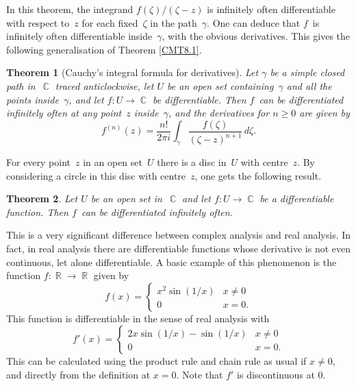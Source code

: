 \documentclass{amsproc}
\newtheorem{theorem}{Theorem}[subsection]
\theoremstyle{definition}
\theoremstyle{remark}
\DeclareMathOperator{\R}{\mathbb{R}}
\DeclareMathOperator{\C}{\mathbb{C}}
\numberwithin{equation}{section}
\begin{document}
In this theorem, the integrand $ f(\zeta)/(\zeta - z) $ is infinitely often differentiable with respect to~$ z $ for each fixed~$ \zeta $ in the path~$ \gamma $.
One can deduce that $ f $~is infinitely often differentiable inside~$ \gamma $, with the obvious derivatives. This gives the following generalisation of Theorem \ref{CMT8.1}.

\begin{theorem}[Cauchy's integral formula for derivatives] \label{CMT8.2}
Let $ \gamma $ be a simple closed path in~$ \C $ traced anticlockwise, let $ U $ be an open set containing~$ \gamma $ and all the points inside~$ \gamma $, and
let $ f: U \to \C $ be differentiable. Then $ f $~can be differentiated infinitely often at any point~$ z $ inside~$ \gamma $, and the derivatives for $ n \geq 0 $ are given by
$$
f^{(n)}(z) = \dfrac{n!}{2\pi i}\int_\gamma \dfrac{f(\zeta)}{(\zeta - z)^{n + 1}}\,d\zeta.
$$
\end{theorem}

For every point~$ z $ in an open set~$ U $ there is a disc in~$ U $ with centre~$ z $. By considering a circle in this disc with centre~$ z $, one gets the following result.

\begin{theorem} \label{CMT8.3}
Let $ U $ be an open set in~$ \C $ and let $ f: U \to \C $ be a differentiable function. Then $ f $~can be differentiated infinitely often.
\end{theorem}

This is a very significant difference between complex analysis and real analysis. In fact, in real analysis there are differentiable functions whose derivative
is not even continuous, let alone differentiable. A basic example of this phenomenon is the function $ f: \R \to \R $ given by
$$
f(x) =
\begin{cases}
x^2 \sin(1/x) & x \neq 0 \\
0 & x = 0.
\end{cases}
$$
This function is differentiable in the sense of real analysis with
$$
f'(x) =
\begin{cases}
2x \sin(1/x) - \sin(1/x) & x \neq 0 \\
0 & x = 0.
\end{cases}
$$
This can be calculated using the product rule and chain rule as usual if $ x \neq 0 $, and directly from the definition at $ x = 0 $.
Note that $ f' $ is discontinuous at $ 0 $.
\end{document}
